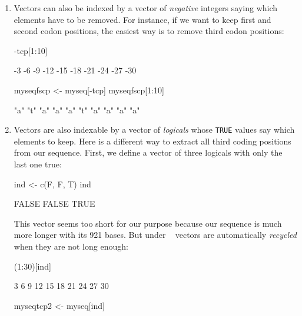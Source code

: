 \documentclass{article}
\begin{document}
\begin{enumerate}
 \item Vectors can also be indexed by a vector of \emph{negative} integers saying which
elements have to be removed. For instance, if we want to keep first and second codon positions,
the easiest way is to remove third codon positions:

\begin{Schunk}
\begin{Sinput}
 -tcp[1:10]
\end{Sinput}
\begin{Soutput}
 [1]  -3  -6  -9 -12 -15 -18 -21 -24 -27 -30
\end{Soutput}
\begin{Sinput}
 myseqfscp <- myseq[-tcp]
 myseqfscp[1:10]
\end{Sinput}
\begin{Soutput}
 [1] "a" "t" "a" "a" "a" "t" "a" "a" "a" "a"
\end{Soutput}
\end{Schunk}

\item Vectors are also indexable by a vector of \emph{logicals} whose \texttt{TRUE}
values say which elements to keep. Here is a different way to extract all third coding positions
from our sequence. First, we define a vector of three logicals with only the last one true:

\begin{Schunk}
\begin{Sinput}
 ind <- c(F, F, T)
 ind
\end{Sinput}
\begin{Soutput}
[1] FALSE FALSE  TRUE
\end{Soutput}
\end{Schunk}

This vector seems too short for our purpose because our sequence is much more longer
with its 921 bases. But under \Rlogo{}~ vectors are automatically \emph{recycled}
when they are not long enough:

\begin{Schunk}
\begin{Sinput}
 (1:30)[ind]
\end{Sinput}
\begin{Soutput}
 [1]  3  6  9 12 15 18 21 24 27 30
\end{Soutput}
\begin{Sinput}
 myseqtcp2 <- myseq[ind]
\end{Sinput}
\end{Schunk}


\end{enumerate}
\end{document}
